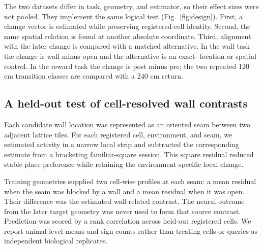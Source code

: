 \documentclass[10pt,twocolumn]{article}
\begin{document}
The two datasets differ in task, geometry, and estimator, so their effect sizes
were not pooled. They implement the same logical test (Fig.~\ref{fig:design}).
First, a change vector is estimated while preserving registered-cell identity.
Second, the same spatial relation is found at another absolute coordinate.
Third, alignment with the later change is compared with a matched alternative.
In the wall task the change is wall minus open and the alternative is an exact-
location or spatial control. In the reward task the change is post minus pre;
the two repeated 120 cm transition classes are compared with a 240 cm return.

\subsection{A held-out test of cell-resolved wall contrasts}

Each candidate wall location was represented as an oriented seam between two
adjacent lattice tiles. For each registered cell, environment, and seam, we
estimated activity in a narrow local strip and subtracted the corresponding
estimate from a bracketing familiar-square session. This square residual
reduced stable place preference while retaining the environment-specific local
change.

Training geometries supplied two cell-wise profiles at each seam: a mean
residual when the seam was blocked by a wall and a mean residual when it was
open. Their difference was the estimated wall-related contrast. The neural outcome
from the later target geometry was never used to form that source contrast.
Prediction was scored by a rank correlation across held-out registered cells.
We report animal-level means and sign counts rather than treating cells or
queries as independent biological replicates.
\end{document}

